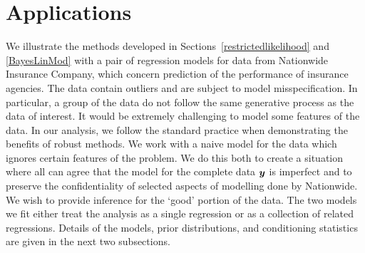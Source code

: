 \documentclass[12pt]{article}
\newcommand{\by}{\mbox{\boldmath $y$}}
\begin{document}
%
%
\section{Applications}
\label{Applications}
We illustrate the methods developed in Sections~\ref{restrictedlikelihood} and \ref{BayesLinMod} with a pair of regression models for 
data from Nationwide Insurance Company, which concern prediction of
the performance of insurance agencies.
The data contain outliers and are subject to model misspecification.  
In particular, a group of the data do not follow the same generative process as the data of interest.  It would be 
extremely challenging to model some features of the data.  
In our analysis, we follow the standard practice when demonstrating the benefits of robust 
methods.  We work with a naive model for the data which ignores certain features of the problem.  We
do this both to create a situation where all can agree that the model for the complete data $\by$ is imperfect
and to preserve the confidentiality of selected aspects of modelling done by Nationwide.  
We wish to provide inference for the `good' portion of the data.  The two models we fit either treat the analysis
as a single regression or as a collection of related regressions.  Details of the models, prior distributions, 
and conditioning statistics are given in the next two subsections.  

\end{document}
